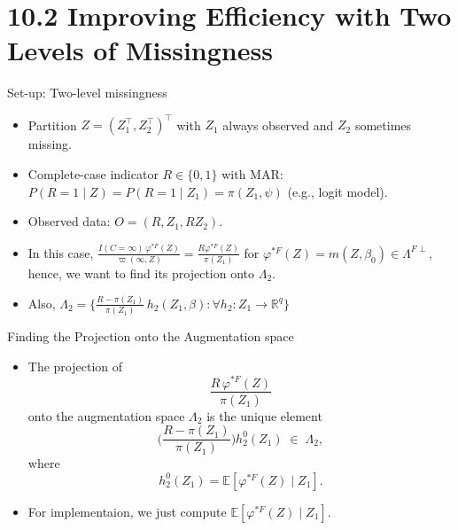 \documentclass[xcolor=dvipsnames,aspectratio=169]{beamer}
\newcommand{\E}{\mathbb{E}}
\newcommand{\1}{\mathbbm{1}}
\begin{document}
\section{10.2 Improving Efficiency with Two Levels of Missingness}

\begin{frame}{Set-up: Two-level missingness}
  \begin{itemize}
    \item Partition $Z=(Z_1^\top,Z_2^\top)^\top$ with $Z_1$ always observed and $Z_2$ sometimes missing.
    \item Complete-case indicator $R\in\{0,1\}$ with MAR: \\ $P(R=1\mid Z)=P(R=1\mid Z_1)=\pi(Z_1,\psi)$ (e.g., logit model).
    \item Observed data: $O=(R, Z_1, RZ_2)$.
    \item In this case, $\frac{I(C=\infty)\,\varphi^{\ast F}(Z)}
     {\varpi(\infty,Z)}=\frac{R\varphi^{\ast F}(Z)}{\pi(Z_1)}$ for $\varphi^{\ast F}(Z)=m(Z,\beta_0)\in \Lambda^{F\perp}$, hence, we want to find its projection onto $\Lambda_2$.
    \item Also, $\Lambda_2=\{\frac{R-\pi(Z_1)}{\pi(Z_1)}\,h_2(Z_1,\beta) : \forall h_2 : Z_1\rightarrow \mathbb{R}^q\}$
  \end{itemize}
\end{frame}

\begin{frame}{Finding the Projection onto the Augmentation space}
  \begin{tcolorbox}[colframe=Cyan,title=Theorem 10.2]
    \begin{itemize}
      \item The projection of 
      \[
        \frac{R\,\varphi^{\ast F}(Z)}{\pi(Z_{1})}
      \]
      onto the augmentation space $\Lambda_{2}$ is the unique element
      \[
        \Biggl(\frac{R-\pi(Z_{1})}{\pi(Z_{1})}\Biggr)h^{0}_{2}(Z_{1}) \;\in\; \Lambda_{2},
      \]
      where
      \[
        h^{0}_{2}(Z_{1}) = \E\!\left[\varphi^{\ast F}(Z)\mid Z_{1}\right].
      \]
    \end{itemize}
  \end{tcolorbox}
  \begin{itemize}
    \item For implementaion, we just compute $\E\!\left[\varphi^{\ast F}(Z)\mid Z_{1}\right]$. 
  \end{itemize}
\end{frame}
\end{document}
